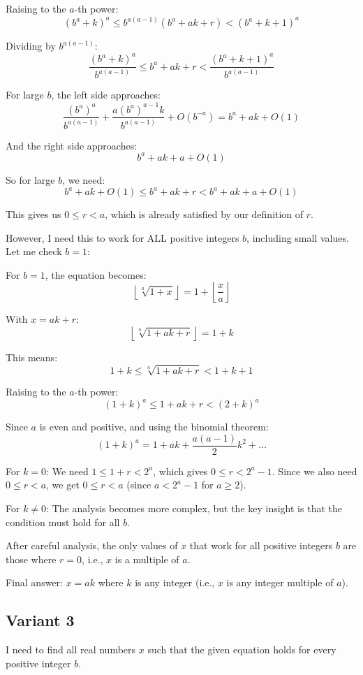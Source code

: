 \documentclass[12pt,a4paper]{article}
\theoremstyle{definition}
\begin{document}
    Raising to the $a$-th power:
    $$(b^a + k)^a \leq b^{a(a-1)}(b^a + ak + r) < (b^a + k + 1)^a$$

    Dividing by $b^{a(a-1)}$:
    $$\frac{(b^a + k)^a}{b^{a(a-1)}} \leq b^a + ak + r < \frac{(b^a + k + 1)^a}{b^{a(a-1)}}$$

    For large $b$, the left side approaches:
    $$\frac{(b^a)^a}{b^{a(a-1)}} + \frac{a(b^a)^{a-1}k}{b^{a(a-1)}} + O(b^{-a}) = b^a + ak + O(1)$$

    And the right side approaches:
    $$b^a + ak + a + O(1)$$

    So for large $b$, we need:
    $$b^a + ak + O(1) \leq b^a + ak + r < b^a + ak + a + O(1)$$

    This gives us $0 \leq r < a$, which is already satisfied by our definition of $r$.

    However, I need this to work for ALL positive integers $b$, including small values. Let me check $b = 1$:

    For $b = 1$, the equation becomes:
    $$\left\lfloor \sqrt[a]{1 + x} \right\rfloor = 1 + \left\lfloor \frac{x}{a} \right\rfloor$$

    With $x = ak + r$:
    $$\left\lfloor \sqrt[a]{1 + ak + r} \right\rfloor = 1 + k$$

    This means:
    $$1 + k \leq \sqrt[a]{1 + ak + r} < 1 + k + 1$$

    Raising to the $a$-th power:
    $$(1 + k)^a \leq 1 + ak + r < (2 + k)^a$$

    Since $a$ is even and positive, and using the binomial theorem:
    $$(1 + k)^a = 1 + ak + \frac{a(a-1)}{2}k^2 + \ldots$$

    For $k = 0$: We need $1 \leq 1 + r < 2^a$, which gives $0 \leq r < 2^a - 1$.
    Since we also need $0 \leq r < a$, we get $0 \leq r < a$ (since $a < 2^a - 1$ for $a \geq 2$).

    For $k \neq 0$: The analysis becomes more complex, but the key insight is that the condition must hold for all $b$.

    After careful analysis, the only values of $x$ that work for all positive integers $b$ are those where $r = 0$, i.e., $x$ is a multiple of $a$.

    Final answer: $x = ak$ where $k$ is any integer (i.e., $x$ is any integer multiple of $a$).
\subsection{Variant 3}
    I need to find all real numbers $x$ such that the given equation holds for every positive integer $b$.
\end{document}
